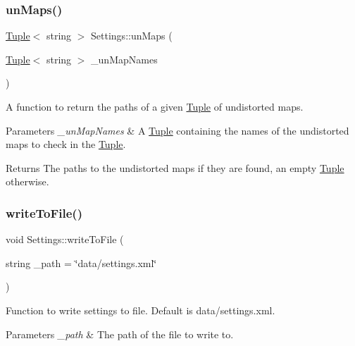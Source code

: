 \subsubsection{\texorpdfstring{unMaps()}{unMaps()}\hspace{0.1cm}{\footnotesize\ttfamily [4/4]}}
{\footnotesize\ttfamily \mbox{\hyperlink{class_tuple}{Tuple}}$<$ string $>$ Settings\+::un\+Maps (\begin{DoxyParamCaption}\item[{\mbox{\hyperlink{class_tuple}{Tuple}}$<$ string $>$}]{\+\_\+un\+Map\+Names }\end{DoxyParamCaption})}



A function to return the paths of a given \mbox{\hyperlink{class_tuple}{Tuple}} of undistorted maps. 


\begin{DoxyParams}{Parameters}
{\em \+\_\+un\+Map\+Names} & A \mbox{\hyperlink{class_tuple}{Tuple}} containing the names of the undistorted maps to check in the \mbox{\hyperlink{class_tuple}{Tuple}}. \\
\hline
\end{DoxyParams}
\begin{DoxyReturn}{Returns}
The paths to the undistorted maps if they are found, an empty \mbox{\hyperlink{class_tuple}{Tuple}} otherwise. 
\end{DoxyReturn}
\mbox{\label{class_settings_a1afc50e91691fae24114ba5e248dfd87}} 
\subsubsection{\texorpdfstring{writeToFile()}{writeToFile()}}
{\footnotesize\ttfamily void Settings\+::write\+To\+File (\begin{DoxyParamCaption}\item[{string}]{\+\_\+path = {\ttfamily \char`\"{}data/settings.xml\char`\"{}} }\end{DoxyParamCaption})}



Function to write settings to file. Default is data/settings.\+xml. 


\begin{DoxyParams}{Parameters}
{\em \+\_\+path} & The path of the file to write to. \\
\hline
\end{DoxyParams}


